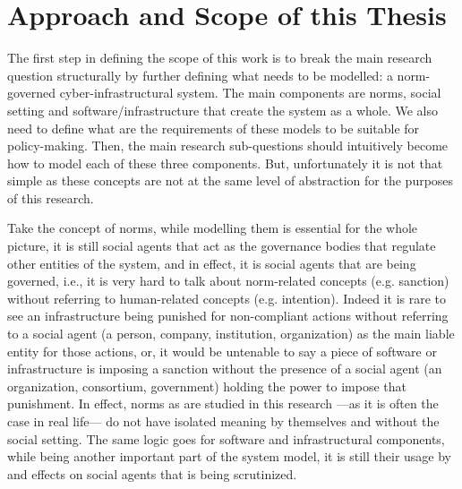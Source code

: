 \section{Approach and Scope of this Thesis}
The first step in defining the scope of this work is to break the main research question structurally by further defining what needs to be modelled: a norm-governed cyber-infrastructural system. The main components are norms, social setting and software/infrastructure that create the system as a whole. We also need to define what are the requirements of these models to be suitable for policy-making.
Then, the main research sub-questions should intuitively become how to model each of these three components. But, unfortunately it is not that simple as these concepts are not at the same level of abstraction for the purposes of this research. 

Take the concept of norms, while modelling them is essential for the whole picture, it is still social agents that act as the governance bodies that regulate other entities of the system, and in effect, it is social agents that are being governed, i.e., it is very hard to talk about norm-related concepts (e.g. sanction) without referring to human-related concepts (e.g. intention). Indeed it is rare to see an infrastructure being punished for non-compliant actions without referring to a social agent (a person, company, institution, organization) as the main liable entity for those actions, or, it would be untenable to say a piece of software or infrastructure is imposing a sanction without the presence of a social agent (an organization, consortium, government)  holding the power to impose that punishment. In effect, norms as are studied in this research ---as it is often the case in real life--- do not have isolated meaning by themselves and without the social setting. The same logic goes for software and infrastructural components, while being another important part of the system model, it is still their usage by and effects on social agents that is being scrutinized.

